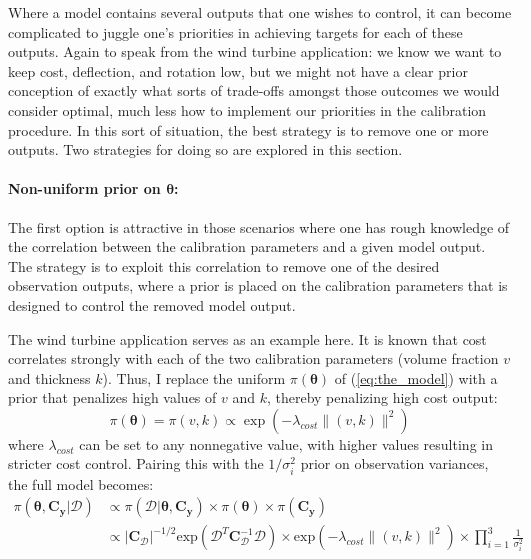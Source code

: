 \documentclass{article}
\begin{document}
Where a model contains several outputs that one wishes to control, it can become complicated to juggle one's priorities in achieving targets for each of these outputs. Again to speak from the wind turbine application: we know we want to keep cost, deflection, and rotation low, but we might not have a clear prior conception of exactly what sorts of trade-offs amongst those outcomes we would consider optimal, much less how to implement our priorities in the calibration procedure. In this sort of situation, the best strategy is to remove one or more outputs. Two strategies for doing so are explored in this section.

\paragraph{Non-uniform prior on $\boldsymbol \theta$:}\label{non-uniform_prior}


The first option is attractive in those scenarios where one has rough knowledge of the correlation between the calibration parameters and a given model output. The strategy is to exploit this correlation to remove one of the desired observation outputs, where a prior is placed on the calibration parameters that is designed to control the removed model output.

The wind turbine application serves as an example here. It is known that cost correlates strongly with each of the two calibration parameters (volume fraction $v$ and thickness $k$). Thus, I replace the uniform $\pi(\boldsymbol \theta)$ of (\ref{eq:the_model}) with a prior that penalizes high values of $v$ and $k$, thereby penalizing high cost output:
\begin{equation}\label{eq:theta_prior}
\pi(\boldsymbol \theta)=\pi(v,k)\propto \exp(-\lambda_{cost}\lVert (v,k)\rVert ^2)
\end{equation}
where $\lambda_{cost}$ can be set to any nonnegative value, with higher values resulting in stricter cost control. Pairing this with the $1/\sigma^2_i$ prior on observation variances, the full model becomes:
\begin{equation}\label{full_model_3}
\begin{aligned}
\pi(\boldsymbol\theta,\mathbf C_{\mathbf y}|\mathcal D ) &\propto
\pi(\mathcal D|\boldsymbol\theta,\mathbf C_{\mathbf y}) \times \pi(\boldsymbol\theta) \times \pi(\mathbf C_{\mathbf y})\\
&\propto \lvert \mathbf C_{\mathcal D} \rvert ^{-1/2} \mathrm{exp}(\mathcal D^T \mathbf C_{\mathcal D}^{-1} \mathcal D) \times \mathrm{exp}(-\lambda_{cost}\lVert(v,k)\rVert^2)\times\prod_{i=1}^3 \frac1{\sigma^2_i}
\end{aligned}
\end{equation}
\end{document}
